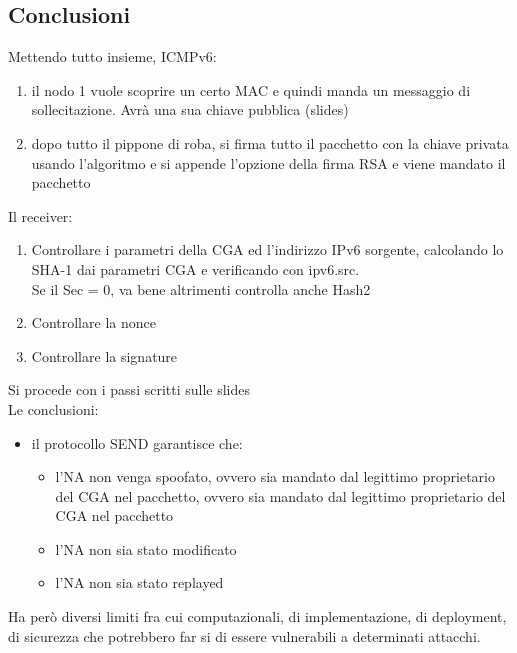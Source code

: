 \documentclass[12pt, oneside]{extbook} %
\begin{document}
\subsection{Conclusioni}
Mettendo tutto insieme, ICMPv6:
    \begin{enumerate}
        \item il nodo 1 vuole scoprire un certo MAC e quindi manda un messaggio di sollecitazione. Avrà una sua chiave pubblica (slides)
        \item dopo tutto il pippone di roba, si firma tutto il pacchetto con la chiave privata usando l'algoritmo e si appende l'opzione della firma RSA e viene mandato il pacchetto
    \end{enumerate}
Il receiver:
    \begin{enumerate}
        \item Controllare i parametri della CGA ed l'indirizzo IPv6 sorgente, calcolando lo SHA-1 dai parametri CGA e verificando con ipv6.src.
        \\Se il Sec = 0, va bene altrimenti controlla anche Hash2
        \item Controllare la nonce
        \item Controllare la signature
\end{enumerate}
Si procede con i passi scritti sulle slides\\ Le conclusioni:
\begin{itemize}
    \item il protocollo SEND garantisce che:
        \begin{itemize}
            \item l'NA non venga spoofato, ovvero sia mandato dal legittimo proprietario del CGA nel pacchetto, ovvero sia mandato dal legittimo proprietario del CGA nel pacchetto
            \item l'NA non sia stato modificato
            \item l'NA non sia stato replayed 
        \end{itemize}
\end{itemize}
Ha però diversi limiti fra cui computazionali, di implementazione, di deployment, di sicurezza che potrebbero far si di essere vulnerabili a determinati attacchi.
\end{document}
